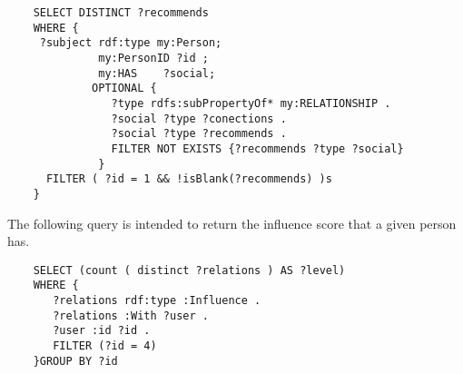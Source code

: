 \begin{verbatim}
    SELECT DISTINCT ?recommends
    WHERE {
     ?subject rdf:type my:Person;
              my:PersonID ?id ;
              my:HAS	?social;
             OPTIONAL {
                ?type rdfs:subPropertyOf* my:RELATIONSHIP .
                ?social ?type ?conections .
                ?social	?type ?recommends .
                FILTER NOT EXISTS {?recommends ?type ?social}
              } 
      FILTER ( ?id = 1 && !isBlank(?recommends) )s
    }
\end{verbatim}


The following query is intended to return the influence score that a given person has.

\begin{verbatim}
    SELECT (count ( distinct ?relations ) AS ?level)
    WHERE {
       ?relations rdf:type :Influence .
       ?relations :With ?user .
       ?user :id ?id .
       FILTER (?id = 4)
    }GROUP BY ?id
\end{verbatim}


